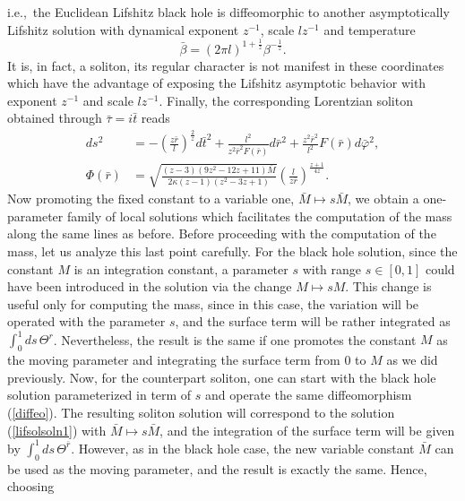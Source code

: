 \documentclass[prd,twocolumn,superscriptaddress,amsmath,amssymb,nofootinbib]{revtex4-1}
\begin{document}
i.e.,\ the Euclidean Lifshitz black hole is diffeomorphic to
another asymptotically Lifshitz solution with dynamical
exponent $z^{-1}$, scale $lz^{-1}$ and temperature
\begin{equation}
\bar{\beta}=\left(2\pi l\right)^{1+\frac{1}{z}}\beta^{-\frac{1}{z}}.
\end{equation}
It is, in fact, a soliton, its regular character is not manifest
in these coordinates which have the advantage of exposing the
Lifshitz asymptotic behavior with exponent $z^{-1}$ and scale
$lz^{-1}$. Finally, the corresponding Lorentzian soliton
obtained through $\bar{\tau}=i\bar{t}$ reads
\begin{subequations}\label{lifsolsoln1}
\begin{align}
ds^2&=-\left(\frac{z\bar{r}}{l}\right)^{\frac{2}{z}}d\bar{t}^2
+\frac{l^2}{z^2\bar{r}^2 F(\bar{r})}d\bar{r}^2
+\frac{z^2\bar{r}^2}{l^2}F(\bar{r})d\bar{\varphi}^2,\\
\Phi(\bar{r})&=\sqrt{\frac{(z-3)(9z^2-12z+11)\bar{M}}{2\kappa(z-1)(z^2-3z+1)}}
\left(\frac{l}{z\bar{r}}\right)^{\frac{z+1}{4z}}.
\end{align}
\end{subequations}
Now promoting the fixed constant to a variable one,
$\bar{M}{\mapsto}s\bar{M}$, we obtain a one-parameter family of
local solutions which facilitates the computation of the mass
along the same lines as before. Before proceeding with the
computation of the mass, let us analyze this last point
carefully. For the black hole solution, since the constant $M$
is an integration constant, a parameter $s$ with range $s\in
[0,1]$ could have been introduced in the solution via the
change $M{\mapsto}sM$. This change is useful only for computing
the mass, since in this case, the variation will be operated
with the parameter $s$, and the surface term will be rather
integrated as $\int_0^1 ds\,\Theta^r$. Nevertheless, the result
is the same if one promotes the constant $M$ as the moving
parameter and integrating the surface term from $0$ to $M$ as
we did previously. Now, for the counterpart soliton, one can
start with the black hole solution parameterized in term of $s$
and operate the same diffeomorphism (\ref{diffeo}). The
resulting soliton solution will correspond to the solution
(\ref{lifsolsoln1}) with $\bar{M}{\mapsto}s\bar{M}$, and the
integration of the surface term will be given by $\int_0^1
ds\,\Theta^{\bar{r}}$. However, as in the black hole case, the
new variable constant $\bar{M}$ can be used as the moving
parameter, and the result is exactly the same. Hence, choosing
\end{document}
